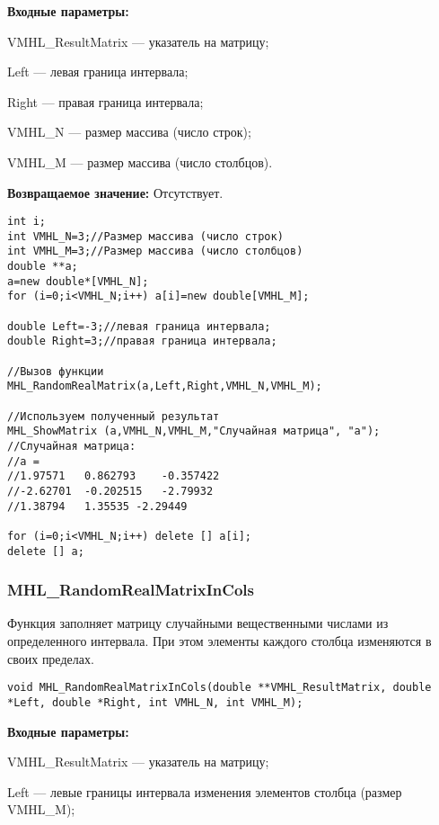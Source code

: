 \documentclass[a4paper,12pt]{article}
\begin{document}
\textbf{Входные параметры:}

 VMHL\_ResultMatrix --- указатель на матрицу;
 
 Left --- левая граница интервала;
 
 Right --- правая граница интервала;
 
 VMHL\_N --- размер массива (число строк);
 
 VMHL\_M --- размер массива (число столбцов).

\textbf{Возвращаемое значение:}
Отсутствует.


\begin{lstlisting}[label=code_use_MHL_RandomRealMatrix,caption=Пример использования]
int i;
int VMHL_N=3;//Размер массива (число строк)
int VMHL_M=3;//Размер массива (число столбцов)
double **a;
a=new double*[VMHL_N];
for (i=0;i<VMHL_N;i++) a[i]=new double[VMHL_M];

double Left=-3;//левая граница интервала;
double Right=3;//правая граница интервала;

//Вызов функции
MHL_RandomRealMatrix(a,Left,Right,VMHL_N,VMHL_M);

//Используем полученный результат
MHL_ShowMatrix (a,VMHL_N,VMHL_M,"Случайная матрица", "a");
//Случайная матрица:
//a =
//1.97571	0.862793	-0.357422
//-2.62701	-0.202515	-2.79932
//1.38794	1.35535	-2.29449

for (i=0;i<VMHL_N;i++) delete [] a[i];
delete [] a;
\end{lstlisting}

\subsubsection{MHL\_RandomRealMatrixInCols}\label{MHL_RandomRealMatrixInCols}

Функция заполняет матрицу случайными вещественными числами из определенного интервала. При этом элементы каждого столбца изменяются в своих пределах.


\begin{lstlisting}[label=code_syntax_MHL_RandomRealMatrixInCols,caption=Синтаксис]
void MHL_RandomRealMatrixInCols(double **VMHL_ResultMatrix, double *Left, double *Right, int VMHL_N, int VMHL_M);
\end{lstlisting}

\textbf{Входные параметры:}

 VMHL\_ResultMatrix --- указатель на матрицу;
 
 Left --- левые границы интервала изменения элементов столбца (размер VMHL\_M);
 
\end{document}
